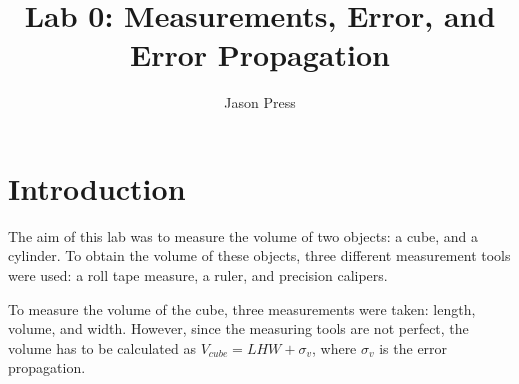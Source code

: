 \title{Lab 0: Measurements, Error, and Error Propagation}
\author{Jason Press}





\maketitle


\section{Introduction}

The aim of this lab was to measure the volume of two objects: a cube, and a cylinder. To obtain the volume of these objects, three different measurement tools were used: a roll tape measure, a ruler, and precision calipers.

To measure the volume of the cube, three measurements were taken: length, volume, and width. However, since the measuring tools are not perfect, the volume has to be calculated as $V_{cube}=LHW+\sigma_{v}$, where $\sigma_{v}$ is the error propagation.



